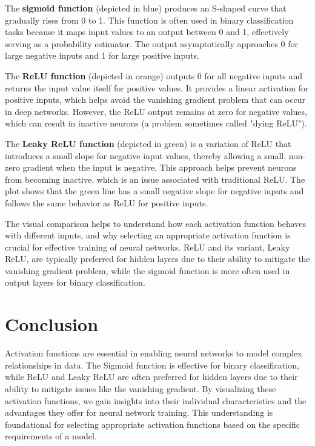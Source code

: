 \documentclass{article}
\begin{document}
The \textbf{sigmoid function} (depicted in blue) produces an S-shaped curve that gradually rises from 0 to 1. This function is often used in binary classification tasks because it maps input values to an output between 0 and 1, effectively serving as a probability estimator. The output asymptotically approaches 0 for large negative inputs and 1 for large positive inputs.

The \textbf{ReLU function} (depicted in orange) outputs 0 for all negative inputs and returns the input value itself for positive values. It provides a linear activation for positive inputs, which helps avoid the vanishing gradient problem that can occur in deep networks. However, the ReLU output remains at zero for negative values, which can result in inactive neurons (a problem sometimes called "dying ReLU").

The \textbf{Leaky ReLU function} (depicted in green) is a variation of ReLU that introduces a small slope for negative input values, thereby allowing a small, non-zero gradient when the input is negative. This approach helps prevent neurons from becoming inactive, which is an issue associated with traditional ReLU. The plot shows that the green line has a small negative slope for negative inputs and follows the same behavior as ReLU for positive inputs.

The visual comparison helps to understand how each activation function behaves with different inputs, and why selecting an appropriate activation function is crucial for effective training of neural networks. ReLU and its variant, Leaky ReLU, are typically preferred for hidden layers due to their ability to mitigate the vanishing gradient problem, while the sigmoid function is more often used in output layers for binary classification.


\section{Conclusion}
Activation functions are essential in enabling neural networks to model complex relationships in data. The Sigmoid function is effective for binary classification, while ReLU and Leaky ReLU are often preferred for hidden layers due to their ability to mitigate issues like the vanishing gradient. By visualizing these activation functions, we gain insights into their individual characteristics and the advantages they offer for neural network training. This understanding is foundational for selecting appropriate activation functions based on the specific requirements of a model.
\end{document}
